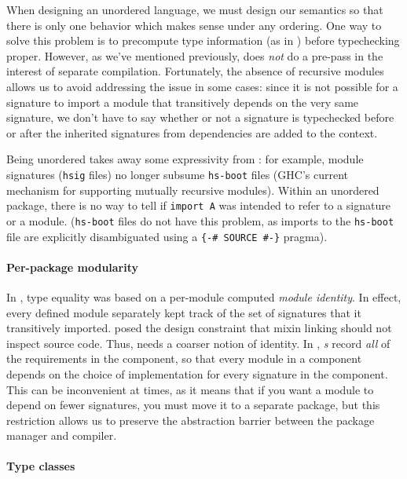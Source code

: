 When designing an unordered language, we must design our semantics so
that there is only one behavior which makes sense under any ordering.
One way to solve this problem is to precompute type information
(as in \OldBackpack{}) before typechecking proper.  However, as we've mentioned previously,
\Backpack{} does \emph{not} do a pre-pass in the interest of
separate compilation.  Fortunately, the absence of recursive modules
allows us to avoid addressing the issue in some cases: since it is not possible
for a \Backpack{} signature to import a module that transitively
depends on the very same signature, we don't have to say whether or not
a signature is typechecked before or after the inherited signatures from
dependencies are added to the context.

Being unordered takes away some expressivity from \Backpack{}: for example, module
signatures (\verb|hsig| files) no longer subsume \verb|hs-boot| files
(GHC's current mechanism for supporting mutually recursive modules).
Within an unordered package, there is no way to tell if \verb|import A|
was intended to refer to a signature or a module.  (\verb|hs-boot| files
do not have this problem, as imports to the \verb|hs-boot| file are
explicitly disambiguated using a \verb|{-# SOURCE #-}| pragma).

\paragraph{Per-package modularity}

In \OldBackpack{}, type equality was based on a per-module computed
\emph{module identity}.  In effect, every defined module separately kept
track of the set of signatures that it transitively imported.
\Backpack{} posed the design constraint that mixin linking should not
inspect source code. Thus, \Backpack{} needs a coarser notion of
identity. In \Backpack{}, \emph{\uid{}s} record \emph{all} of the
requirements in the component, so that every module in a component
depends on the choice of implementation for every signature in the
component.  This can be inconvenient at times, as it means that if you
want a module to depend on fewer signatures, you must move it to a
separate package, but this restriction allows us to preserve the
abstraction barrier between the package manager and compiler.

\paragraph{Type classes}

